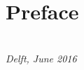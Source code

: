 \chapter*{Preface}
\begin{flushright}
{\makeatletter\itshape
    \@author \\
    
    Delft, June 2016
\makeatother}
\end{flushright}

